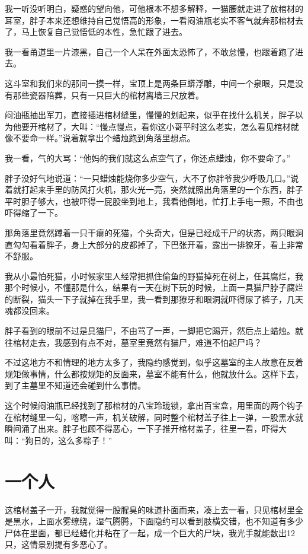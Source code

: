 我一听没听明白，疑惑的望向他，可他根本不想多解释，一猫腰就走进了放棺材的耳室，胖子本来还想维持自己觉悟高的形象，一看闷油瓶老实不客气就奔那棺材去了，马上恢复自己觉悟低的本性，急忙跟了进去。

我一看甬道里一片漆黑，自己一个人呆在外面太恐怖了，不敢怠慢，也跟着跑了进去。

这斗室和我们来的那间一摸一样，宝顶上是两条巨蟒浮雕，中间一个泉眼，只是没有那些瓷器陪葬，只有一只巨大的棺材离墙三尺放着。

闷油瓶抽出军刀，直接插进棺材缝里，慢慢的划起来，似乎在找什么机关，胖子以为他要开棺材了，大叫：“慢点慢点，看你这小哥平时这么老实，怎么看见棺材就像不要命一样。”说着就拿出个蜡烛跑到角落里想点。

我一看，气的大骂：“他妈的我们就这么点空气了，你还点蜡烛，你不要命了。”

胖子没好气地说道：“一只蜡烛能烧你多少空气，大不了你胖爷我少呼吸几口。”说着就打起来手里的防风打火机，那火光一亮，突然就照出角落里的一个东西，胖子平时胆子够大，也被吓得一屁股坐到地上，我看他倒地，忙打上手电一照，不由也吓得缩了一下。

那角落里竟然蹲着一只干瘪的死猫，个头奇大，但是已经成干尸的状态，两只眼洞直勾勾看着胖子，身上大部分的皮都掉了，下巴张开着，露出一排獠牙，看上非常不舒服。

我从小最怕死猫，小时候家里人经常把抓住偷鱼的野猫掉死在树上，任其腐烂，我那个时候小，不懂那是什么，结果有一天在树下玩的时候，上面一具猫尸脖子腐烂的断裂，猫头一下子就掉在我手里，我一看到那獠牙和眼洞就吓得尿了裤子，几天魂都没回来。

胖子看到的眼前不过是具猫尸，不由骂了一声，一脚把它踢开，然后点上蜡烛。就往棺材走去，我感到有点不对，墓室里竟然有猫尸，难道不怕起尸吗？

不过这地方不和情理的地方太多了，我隐约感觉到，似乎这墓室的主人故意在反着规矩做事情，什么都按规矩的反面来，墓室不能有什么，他就放什么。这样下去，到了主墓里不知道还会碰到什么事情。

这个时候闷油瓶已经找到了那棺材的八宝玲珑锁，拿出百宝盒，用里面的两个钩子在棺材缝里一勾，喀嚓一声，机关破解，同时整个棺材盖子往上一弹，一股黑水就瞬间涌了出来。胖子也顾不得恶心，一下子推开棺材盖子，往里一看，吓得大叫：“狗日的，这么多粽子！”

\chapter{一个人}

这棺材盖子一开，我就觉得一股腥臭的味道扑面而来，凑上去一看，只见棺材里全是黑水，上面水雾缭绕，湿气腾腾，下面隐约可以看到肢横交错，也不知道有多少尸体在里面，都已经蜡化并粘在了一起，成一个巨大的尸块，我光手就能数出12只，这情景别提有多恶心了。

